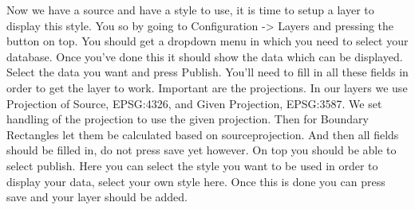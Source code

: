 Now we have a source and have a style to use, it is time to setup a layer to display this style. You so by going to Configuration -> Layers and pressing the button on top. You should get a dropdown menu in which you need to select your database. Once you've done this it should show the data which can be displayed. Select the data you want and press Publish. You'll need to fill in all these fields in order to get the layer to work. Important are the projections. In our layers we use Projection of Source, EPSG:4326, and Given Projection, EPSG:3587. We set handling of the projection to use the given projection. Then for Boundary Rectangles let them be calculated based on sourceprojection. And then all fields should be filled in, do not press save yet however. On top you should be able to select publish. Here you can select the style you want to be used in order to display your data, select your own style here. Once this is done you can press save and your layer should be added.